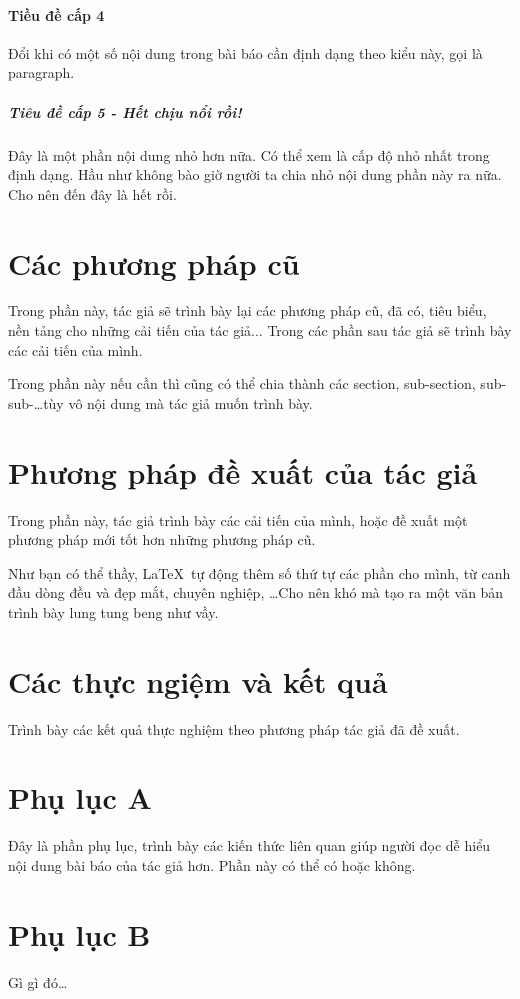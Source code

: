\documentclass[a4paper]{article}
\begin{document}
\paragraph{Tiều đề cấp 4}
Đổi khi có một số nội dung trong bài báo cần định dạng theo kiểu này, gọi là paragraph.

\subparagraph{Tiêu đề cấp 5 - Hết chịu nổi rồi!}
Đây là một phần nội dung nhỏ hơn nữa. Có thể xem là cấp độ nhỏ nhất trong định dạng. Hầu như không bào giờ người ta chia nhỏ nội dung phần này ra nữa. Cho nên đến đây là hết rồi.

\section{Các phương pháp cũ}
Trong phần này, tác giả sẽ trình bày lại các phương pháp cũ, đã có, tiêu biểu, nền tảng cho những cải tiến của tác giả... Trong các phần sau tác giả sẽ trình bày các cải tiến của mình.

Trong phần này nếu cần thì cũng có thể chia thành các section, sub-section, sub-sub-\ldots tùy vô nội dung mà tác giả muốn trình bày.

\section{Phương pháp đề xuất của tác giả}
Trong phần này, tác giả trình bày các cải tiến của mình, hoặc đề xuất một phương pháp mới tốt hơn những phương pháp cũ.


Như bạn có thể thầy, \LaTeX\  tự động thêm số thứ tự các phần cho mình, từ canh đầu dòng đều và đẹp mắt, chuyên nghiệp, \ldots Cho nên 
khó mà tạo ra một
văn bản trình bày 
lung 
tung
beng
như 		vầy.
\section{Các thực ngiệm và kết quả}
Trình bày các kết quả thực nghiệm theo phương pháp tác giả đã đề xuất.

\appendix %
\section{Phụ lục A}
Đây là phần phụ lục, trình bày các kiến thức liên quan giúp người đọc dễ hiểu nội dung bài báo của tác giả hơn. Phần này có thể có hoặc không.

\section{Phụ lục B}
Gì gì đó\ldots
\end{document}
